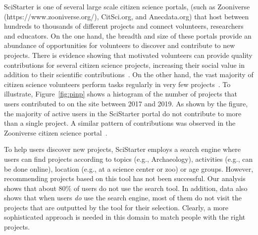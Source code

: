 \documentclass[letterpaper]{article} %
\newcommand{\kibitz}[2]{\ifnum\Comments=1{\textcolor{#1}{#2}}\fi}
\newcommand{\as}[1]{\kibitz{ orange}{[AS:#1]}}
\begin{document}
 SciStarter is one of several large scale citizen science portals, (such as Zooniverse (https://www.zooniverse.org/), CitSci.org, and
Anecdata.org)
 that host between hundreds to thousands of different   projects and  connect volunteers, researchers and educators. On the one hand,
 the breadth and size of these portals provide an abundance of opportunities  for volunteers to discover and contribute to new projects.
  There is evidence showing that   motivated volunteers can provide quality contributions
  for several citizen science projects, increasing their social value in addition to their scientific contributions~\cite{larson2020diverse}.
  On the   other hand, the vast majority of citizen science volunteers perform tasks regularly in very few projects~\cite{ponciano2019characterising}. To illustrate,
    Figure~\ref{fig:pinp} shows a histogram
  of the number of projects that users contributed to on the site between 2017 and 2019. As shown by the figure, the   majority of active users in the SciStarter portal do not contribute to more than a single project.  A similar pattern of contributions was observed in the
  Zooniverse citizen science portal~\cite{segal2018optimizing}.

To help users discover new projects, SciStarter employs  a search engine  where users can find projects  according to topics (e.g., Archaeology), activities (e.g., can be done online), location (e.g., at a science center or zoo) or age groups.
However, recommending projects based on this tool has not been successful.  Our analysis shows that about 80\% of users do not use the search tool. In addition, data also shows that when users \emph{do} use the search engine, most of them do not   visit the projects that are outputted by the tool for their selection. Clearly, a more sophisticated approach is needed in this domain to match people with the right projects.

\end{document}
